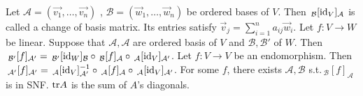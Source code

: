  Let $\mathcal{A} = (\vec{v_1}, \dots, \vec{v_n})$ , $\mathcal{B} = (\vec{w}_1, \dots, \vec{w}_n)$ be ordered bases of $V$. Then $\,_\mathcal{B}[\text{id}_V]_\mathcal{A}$ is called a change of basis matrix. Its entries satisfy $\vec{v}_j = \sum_{i=1}^n a_{ij}\vec{w}_i$.
 Let $f : V \to W$ be linear. Suppose that $\mathcal{A}, \mathcal{A}$ are ordered basis of $V$ and $\mathcal{B}, \mathcal{B}'$ of $W$. Then $\,_{\mathcal{B}'}[f]_{\mathcal{A}'} = \,_{\mathcal{B}'}[\text{id}_W]_{\mathcal{B}} \circ \,_{\mathcal{B}}[f]_{\mathcal{A}} \circ \,_{\mathcal{A}}[\text{id}_V]_{\mathcal{A}'}$.
 Let $f : V \to V$ be an endomorphism. Then $\,_{\mathcal{A}'}[f]_{\mathcal{A}'} = \,_{\mathcal{A}}[\text{id}_V]_{\mathcal{A}'}^{-1} \circ \,_{\mathcal{A}}[f]_{\mathcal{A}} \circ \,_{\mathcal{A}}[\text{id}_V]_{\mathcal{A}'}$.
 For some $f$, there exists $\mathcal{A}, \mathcal{B}$ s.t.\@ $\,_{\mathcal{B}}[f]_{\mathcal{A}}$ is in SNF.
 $\text{tr} A$ is the sum of $A$'s diagonals.